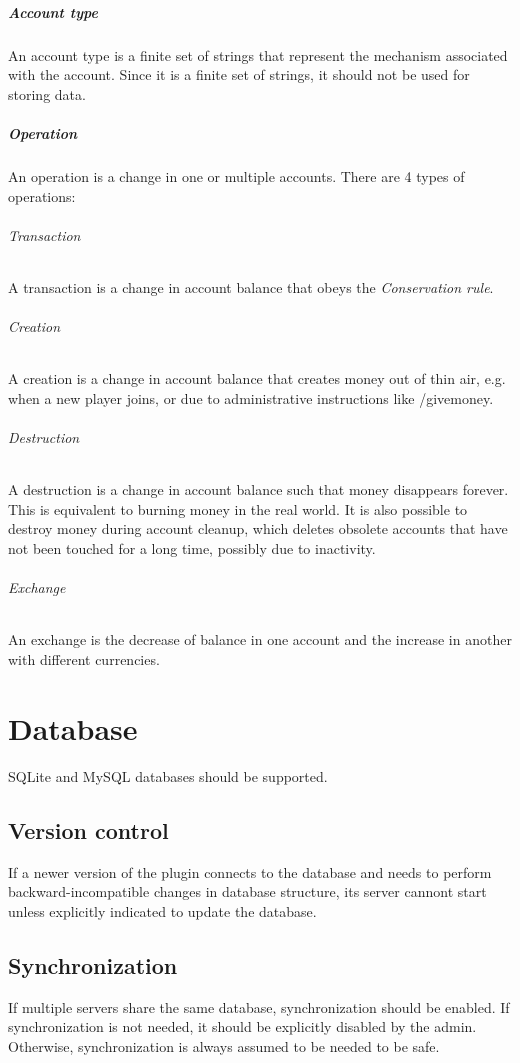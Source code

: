 \documentclass{report}
\begin{document}
			\paragraph{Account type}
				An account type is a finite set of strings that represent the mechanism associated with the account.
				Since it is a finite set of strings, it should not be used for storing data.

			\paragraph{Operation}
				An operation is a change in one or multiple accounts.
				There are 4 types of operations:
				\subparagraph{Transaction} A transaction is a change in account balance that obeys the \textit{Conservation rule}.
				\subparagraph{Creation} A creation is a change in account balance that creates money out of thin air,
					e.g. when a new player joins, or due to administrative instructions like /givemoney.
				\subparagraph{Destruction} A destruction is a change in account balance such that money disappears forever.
					This is equivalent to burning money in the real world.
					It is also possible to destroy money during account cleanup, which
					deletes obsolete accounts that have not been touched for a long time, possibly due to inactivity.
				\subparagraph{Exchange} An exchange is the decrease of balance in one account and the increase in another with different currencies.

		\chapter{Database}
			SQLite and MySQL databases should be supported.

			\section{Version control}
				If a newer version of the plugin connects to the database and needs to perform backward-incompatible changes in database structure,
				its server cannont start unless explicitly indicated to update the database.

			\section{Synchronization}
				If multiple servers share the same database, synchronization should be enabled.
				If synchronization is not needed, it should be explicitly disabled by the admin.
				Otherwise, synchronization is always assumed to be needed to be safe.
\end{document}

